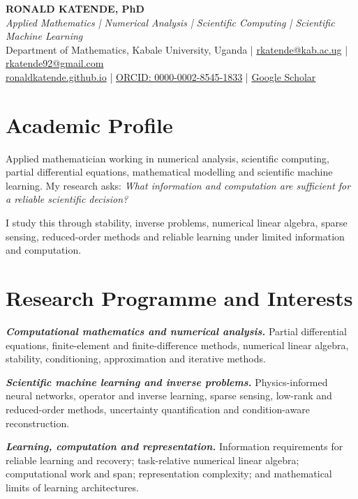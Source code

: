 \documentclass[11pt,a4paper]{article}
\begin{document}
{\fontsize{21}{23}\selectfont\bfseries RONALD KATENDE, PhD}\\[-1pt]

{\large\color{Accent}\textit{
Applied Mathematics | Numerical Analysis | Scientific Computing |
Scientific Machine Learning
}}\\[4pt]

\small
Department of Mathematics, Kabale University, Uganda
\;|\;
\href{mailto:rkatende@kab.ac.ug}{rkatende@kab.ac.ug}
\;|\;
\href{mailto:rkatende92@gmail.com}{rkatende92@gmail.com}
\\[-1pt]
\href{https://ronaldkatende.github.io/}{ronaldkatende.github.io}
\;|\;
\href{https://orcid.org/0000-0002-8545-1833}
{ORCID: 0000-0002-8545-1833}
\;|\;
\href{https://scholar.google.com/citations?user=SvIwEd8AAAAJ}
{Google Scholar}

\section{Academic Profile}

Applied mathematician working in numerical analysis, scientific computing,
partial differential equations, mathematical modelling and scientific
machine learning. My research asks:
\textit{What information and computation are sufficient for a reliable scientific decision?}

I study this through stability, inverse problems, numerical linear algebra,
sparse sensing, reduced-order methods and reliable learning under limited
information and computation.

\section{Research Programme and Interests}

\textit{\textbf{Computational mathematics and numerical analysis.}}
Partial differential equations, finite-element and finite-difference methods,
numerical linear algebra, stability, conditioning, approximation and iterative
methods.

\textit{\textbf{Scientific machine learning and inverse problems.}}
Physics-informed neural networks, operator and inverse learning, sparse sensing,
low-rank and reduced-order methods, uncertainty quantification and
condition-aware reconstruction.

\textit{\textbf{Learning, computation and representation.}}
Information requirements for reliable learning and recovery; task-relative
numerical linear algebra; computational work and span; representation complexity;
and mathematical limits of learning architectures.
\end{document}
